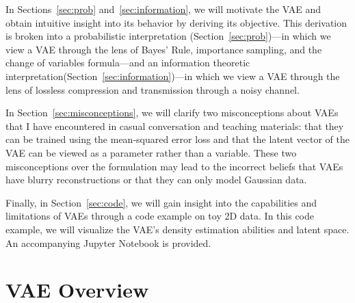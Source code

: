 \documentclass{article}
\begin{document}
In Sections~\ref{sec:prob} and~\ref{sec:information}, we will motivate the VAE and obtain intuitive insight into its behavior by deriving its objective.
This derivation is broken into a probabilistic interpretation (Section~\ref{sec:prob})---in which we view a VAE through the lens of Bayes' Rule, importance sampling, and the change of variables formula---and an information theoretic interpretation(Section~\ref{sec:information})---in which we view a VAE through the lens of lossless compression and transmission through a noisy channel.

In Section~\ref{sec:misconceptions}, we will clarify two misconceptions about VAEs that I have encountered in casual conversation and teaching materials: that they can be trained using the mean-squared error loss and that the latent vector of the VAE can be viewed as a parameter rather than a variable. These two misconceptions over the formulation may lead to the incorrect beliefs that VAEs have blurry reconstructions or that they can only model Gaussian data.

Finally, in Section~\ref{sec:code}, we will gain insight into the capabilities and limitations of VAEs through a code example on toy 2D data. In this code example, we will visualize the VAE's density estimation abilities and latent space. An accompanying Jupyter Notebook is provided.


\section{VAE Overview}
\label{sec:overview}
\end{document}
